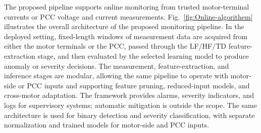 \documentclass[letterpaper,journal]{IEEEtran}
\begin{document}
The proposed pipeline supports online monitoring from trusted motor-terminal currents or PCC voltage and current measurements. Fig.~\ref{fig:Online-algorithem} illustrates the overall architecture of the proposed monitoring pipeline. In the deployed setting, fixed-length windows of measurement data are acquired from either the motor terminals or the PCC, passed through the LF/HF/TD feature-extraction stage, and then evaluated by the selected learning model to produce anomaly or severity decisions. The measurement, feature-extraction, and inference stages are modular, allowing the same pipeline to operate with motor-side or PCC inputs and supporting feature pruning, reduced-input models, and cross-motor adaptation. The framework provides alarms, severity indicators, and logs for supervisory systems; automatic mitigation is outside the scope. The same architecture is used for binary detection and severity classification, with separate normalization and trained models for motor-side and PCC inputs.
\end{document}
